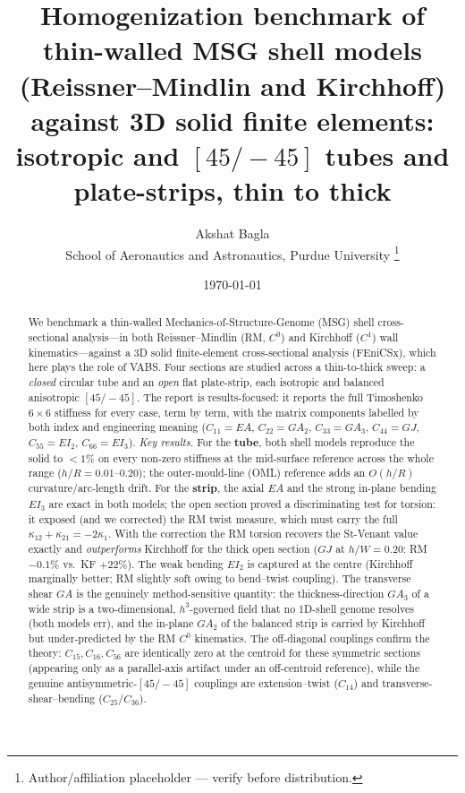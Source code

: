 \documentclass[11pt]{article}
\title{\textbf{Homogenization benchmark of thin-walled MSG shell models\\
(Reissner--Mindlin and Kirchhoff) against 3D solid finite elements:\\
isotropic and $[45/\!-\!45]$ tubes and plate-strips, thin to thick}}
\author{Akshat Bagla\\\small School of Aeronautics and Astronautics, Purdue University%
\thanks{Author/affiliation placeholder --- verify before distribution.}}
\date{\today}
\begin{document}
\maketitle

\begin{abstract}
We benchmark a thin-walled Mechanics-of-Structure-Genome (MSG) shell
cross-sectional analysis---in both Reissner--Mindlin (RM, $C^0$) and Kirchhoff
($C^1$) wall kinematics---against a 3D solid finite-element cross-sectional
analysis (FEniCSx), which here plays the role of VABS. Four sections are studied
across a thin-to-thick sweep: a \emph{closed} circular tube and an \emph{open}
flat plate-strip, each isotropic and balanced anisotropic $[45/\!-\!45]$. The
report is results-focused: it reports the full Timoshenko $6\times6$ stiffness
for every case, term by term, with the matrix components labelled by both index
and engineering meaning ($C_{11}{=}EA$, $C_{22}{=}GA_2$, $C_{33}{=}GA_3$,
$C_{44}{=}GJ$, $C_{55}{=}EI_2$, $C_{66}{=}EI_3$).
\emph{Key results.} For the \textbf{tube}, both shell models reproduce the solid
to $<1\%$ on every non-zero stiffness at the mid-surface reference across the
whole range ($h/R=0.01$--$0.20$); the outer-mould-line (OML) reference adds an
$O(h/R)$ curvature/arc-length drift. For the \textbf{strip}, the axial $EA$ and
the strong in-plane bending $EI_3$ are exact in both models; the open section
proved a discriminating test for torsion: it exposed (and we corrected) the RM
twist measure, which must carry the full $\kappa_{12}{+}\kappa_{21}{=}{-}2\kappa_1$.
With the correction the RM torsion recovers the St-Venant value exactly and
\emph{outperforms} Kirchhoff for the thick open section ($GJ$ at $h/W{=}0.20$: RM
$-0.1\%$ vs.\ KF $+22\%$). The weak bending $EI_2$ is captured at the centre
(Kirchhoff marginally better; RM slightly soft owing to bend--twist coupling).
The transverse shear $GA$ is the genuinely method-sensitive quantity: the
thickness-direction $GA_3$ of a wide strip is a two-dimensional, $h^3$-governed
field that no 1D-shell genome resolves (both models err), and the in-plane $GA_2$
of the balanced strip is carried by Kirchhoff but under-predicted by the RM $C^0$
kinematics. The off-diagonal couplings confirm the theory: $C_{15},C_{16},C_{56}$
are identically zero at the centroid for these symmetric sections (appearing only
as a parallel-axis artifact under an off-centroid reference), while the genuine
antisymmetric-$[45/\!-\!45]$ couplings are extension--twist ($C_{14}$) and
transverse-shear--bending ($C_{25}/C_{36}$).
\end{abstract}
\end{document}
